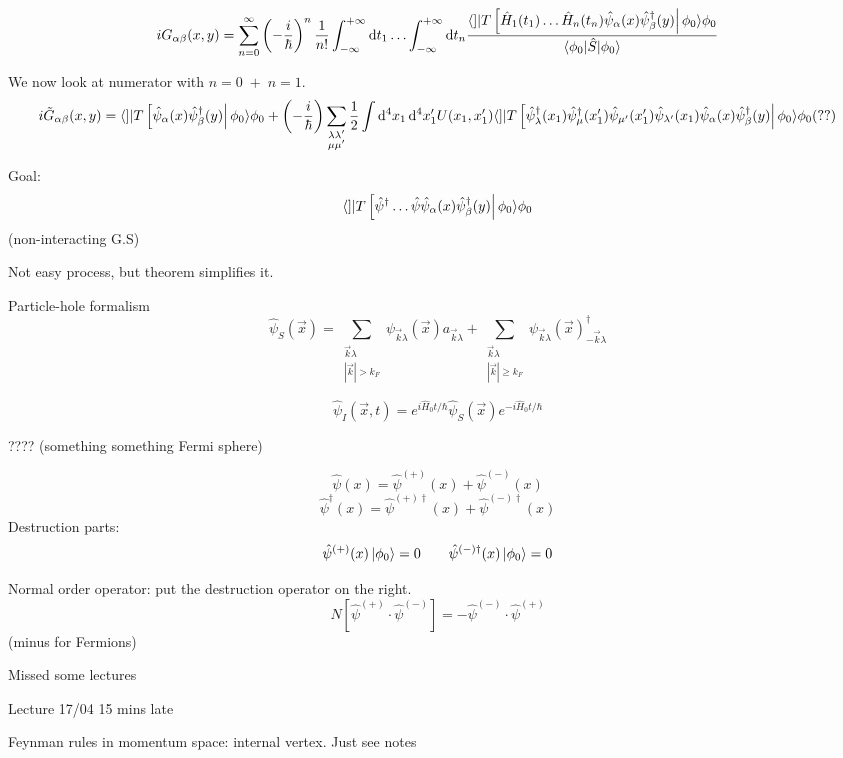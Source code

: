 \[ iG_{\alpha\beta}(x,y) = \sum^\infty_{n=0}\left(- \frac{i}{\hbar}\right)^n \frac{1}{n!} \int^{+\infty}_{-\infty}\diff{t_1} \ldots \int^{+\infty}_{-\infty}\diff{t_n} \frac{\braket[T \left[\hat{H}_1(t_1)\ldots \hat{H}_n(t_n)\hat{\psi}_\alpha(x)\hat{\psi}_\beta^\dagger(y)\right]]{\phi_0}{\phi_0}}{\braket[\hat{S}]{\phi_0}{\phi_0}} \]

We now look at numerator with $n=0 \;+\; n=1$.
\[i\tilde{G}_{\alpha\beta}(x,y) = \braket[T \left[\hat{\psi}_\alpha(x)\hat{\psi}_\beta^\dagger(y)\right]]{\phi_0}{\phi_0} + \left(-\frac{i}{\hbar}\right)\sum_{\substack{\lambda\lambda' \\ \mu\mu'}}\frac{1}{2}\int \diff{^4x_1}\diff{^4x'_1}U(x_1,x'_1)\braket[T \left[\hat{\psi}_\lambda^\dagger(x_1)\hat{\psi}^\dagger_\mu(x_1')\hat{\psi}_{\mu'}(x'_1)\hat{\psi}_{\lambda'}(x_1)\hat{\psi}_\alpha(x)\hat{\psi}_\beta^\dagger(y)\right]]{\phi_0}{\phi_0} (??)\]

Goal:
\[ \braket[T \left[\hat{\psi}^\dagger \ldots \hat{\psi} \hat{\psi}_\alpha(x)\hat{\psi}_\beta^\dagger(y)\right]]{\phi_0}{\phi_0} \]
(non-interacting G.S)

Not easy process, but theorem simplifies it.

Particle-hole formalism
\[ \hat{\psi}_S(\vec{x}) = \sum_{\substack{\vec{k}\lambda \\ |\vec{k}|>k_F}}\psi_{\vec{k}\lambda}(\vec{x})a_{\vec{k}\lambda} + \sum_{\substack{\vec{k}\lambda \\ |\vec{k}|\geq k_F}}\psi_{\vec{k}\lambda}(\vec{x})^\dagger_{-\vec{k}\lambda} \]

\[\hat{\psi}_I(\vec{x},t) = e^{i\hat{H}_0t/\hbar}\hat{\psi}_S(\vec{x})e^{-i\hat{H}_0t / \hbar}\]

???? (something something Fermi sphere)

\[ \hat{\psi}(x) = \hat{\psi}^{(+)}(x) + \hat{\psi}^{(-)}(x) \]
\[ \hat{\psi}^\dagger(x) = \hat{\psi}^{(+)\dagger}(x) + \hat{\psi}^{(-)\dagger}(x) \]
Destruction parts:
\[ \hat{\psi}^{(+)}(x)\left| \phi_0 \right\rangle = 0 \qquad \hat{\psi}^{(-)\dagger}(x)\left| \phi_0 \right\rangle = 0 \]

Normal order operator: put the destruction operator on the right.
\[ N \left[\hat{\psi}^{(+)}\cdot \hat{\psi}^{(-)}\right] = -\hat{\psi}^{(-)}\cdot \hat{\psi}^{(+)}  \]
(minus for Fermions)


Missed some lectures

Lecture 17/04
15 mins late

Feynman rules in momentum space: internal vertex.
Just see notes